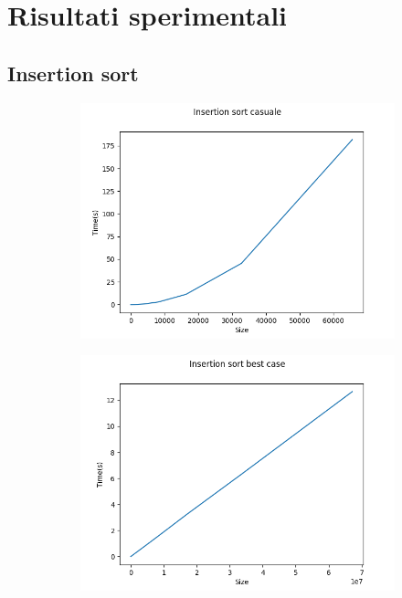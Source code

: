 \documentclass[]{article}
\begin{document}
\section{Risultati sperimentali}
\subsection{Insertion sort}

\begin{figure}[H]
    \centering
    \begin{subfigure}[b]{0.4\linewidth} 
        \centering
        \includegraphics[width=\textwidth]{InsertionSortCasuale}
        \label{fig:insertion_casuale}
    \end{subfigure}
    \quad
    \begin{subfigure}[b]{0.4\linewidth}
        \centering
        \includegraphics[width=\textwidth]{InsertionSortBestCase}

\end{subfigure}
\end{figure}
\end{document}
